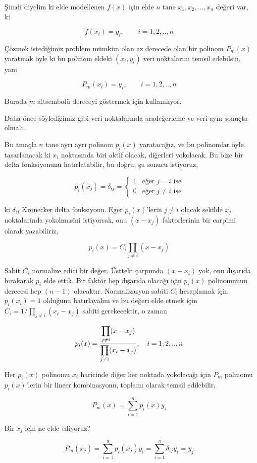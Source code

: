 \documentclass[12pt,fleqn]{article}\usepackage{../../common}
\begin{document}
Şimdi diyelim ki elde modellenen $f(x)$ için elde $n$ tane $x_1,x_2,...,x_n$
değeri var, ki

$$
f(x_i) = y_i, \qquad i=1,2,..,n
$$

Çözmek istediğimiz problem mümkün olan az derecede olan bir polinom $P_m(x)$
yaratmak öyle ki bu polinom eldeki $(x_i,y_i)$ veri noktalarını temsil
edebilsin, yani

$$
P_m(x_i) = y_i, \qquad i=1,2,..,n
$$

Burada $m$ altsembolü dereceyi göstermek için kullanılıyor.

Daha önce söylediğimiz gibi veri noktalarında aradeğerleme ve veri aynı sonuçta
olmalı.

Bu amaçla $n$ tane ayrı ayrı polinom $p_i(x)$ yaratacağız, ve bu polinomlar
öyle tasarlanacak ki $x_i$ noktasında biri aktif olacak, diğerleri yokolacak.
Bu bize bir delta fonksiyonunu hatırlatabilir, bu doğru, şu sonucu istiyoruz,

$$
p_i(x_j) = \delta_{ij} =
\left\{ \begin{array}{ll}
1 & \textrm{eğer } j = i \textrm{ ise} \\
0 & \textrm{eğer } j\ne i \textrm{ ise}
\end{array} \right.
$$

ki $\delta_{ij}$ Kronecker delta fonksiyonu. Eger $p_i(x)$'lerin $j \ne i$
olacak sekilde $x_j$ noktalarinda yokolmasini istiyorsak, onu $(x-x_j)$
faktorlerinin bir carpimi olarak yazabiliriz,

$$
p_i(x) = C_i \prod_{j \ne i} (x-x_j)
$$

Sabit $C_i$ normalize edici bir değer. Üstteki çarpımda $(x-x_i)$ yok,
onu dışarıda bırakarak $p_i$ elde ettik. Bir faktör hep dışarıda olacağı
için $p_i(x)$ polinomunun derecesi hep $(n-1)$ olacaktır. Normalizasyon
sabiti $C_i$ hesaplamak için $p_i(x_i)=1$ olduğunu hatırlayalım ve
bu değeri elde etmek için $C_i = 1 / \prod_{j \ne i} (x_i - x_j)$
sabiti gerekecektir, o zaman

$$
p_i(x) = \frac
{\displaystyle \prod_{j \ne i} (x - x_j)}
{\displaystyle \prod_{j \ne i} (x_i - x_j)},
\quad i=1,2,..,n
$$

Her $p_i(x)$ polinomu $x_i$ haricinde diğer her noktada yokolacağı için $P_m$
polinomu $p_i(x)$'lerin bir lineer kombinasyonu, toplamı olarak temsil
edilebilir,

$$
P_m(x) =  \sum_{i=1}^{n} p_i (x) y_i
$$

Bir $x_j$ için ne elde ediyoruz?

$$
P_m(x_j) = \sum _{i=1}^{n} p_i(x_j) y_i =  \sum _{i=1}^{n} \delta_{ij} y_i = y_j
$$
\end{document}
